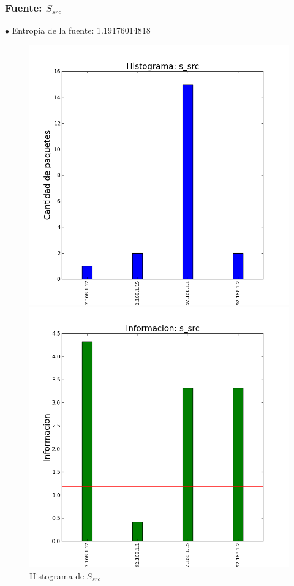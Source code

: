 \subsubsection{Fuente: $S_{src}$}

$\bullet$ Entropía de la fuente: 1.19176014818

\begin{figure}[H]
  \begin{minipage}{0.5\linewidth}
    \includegraphics[width=\linewidth]{../imgs/pruebaFede-ips_s_src_hist.png}
    \caption{Histograma de $S_{src}$}\label{fig:Fede-src-hist}
  \end{minipage}
\hfill
  \begin{minipage}{0.5\linewidth}
    \includegraphics[width=\linewidth]{../imgs/pruebaFede-ips_s_src_info.png}

\end{minipage}
\end{figure}
